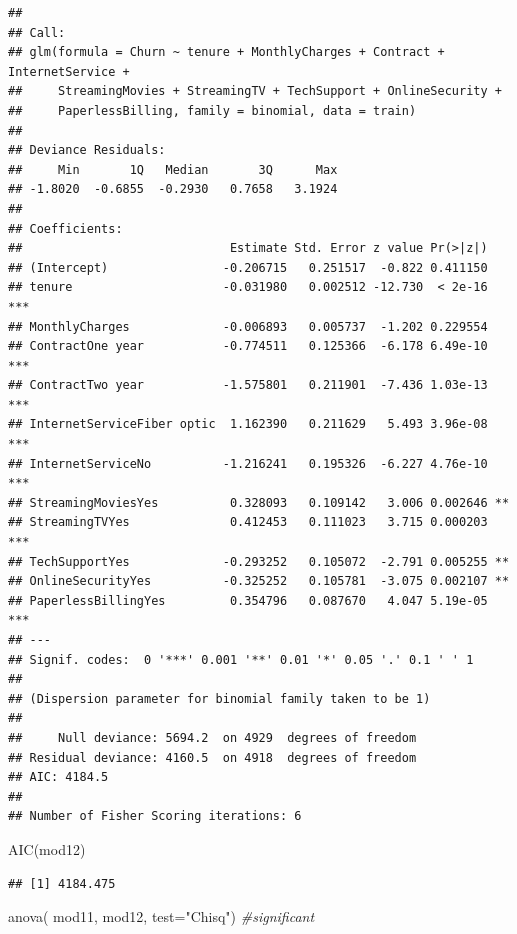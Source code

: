 \documentclass[
  twoside]{article}
\newenvironment{Shaded}{\begin{snugshade}}{\end{snugshade}}
\newcommand{\AttributeTok}[1]{\textcolor[rgb]{0.77,0.63,0.00}{#1}}
\newcommand{\CommentTok}[1]{\textcolor[rgb]{0.56,0.35,0.01}{\textit{#1}}}
\newcommand{\FunctionTok}[1]{\textcolor[rgb]{0.00,0.00,0.00}{#1}}
\newcommand{\NormalTok}[1]{#1}
\newcommand{\StringTok}[1]{\textcolor[rgb]{0.31,0.60,0.02}{#1}}
\begin{document}
\begin{verbatim}
## 
## Call:
## glm(formula = Churn ~ tenure + MonthlyCharges + Contract + InternetService + 
##     StreamingMovies + StreamingTV + TechSupport + OnlineSecurity + 
##     PaperlessBilling, family = binomial, data = train)
## 
## Deviance Residuals: 
##     Min       1Q   Median       3Q      Max  
## -1.8020  -0.6855  -0.2930   0.7658   3.1924  
## 
## Coefficients:
##                             Estimate Std. Error z value Pr(>|z|)    
## (Intercept)                -0.206715   0.251517  -0.822 0.411150    
## tenure                     -0.031980   0.002512 -12.730  < 2e-16 ***
## MonthlyCharges             -0.006893   0.005737  -1.202 0.229554    
## ContractOne year           -0.774511   0.125366  -6.178 6.49e-10 ***
## ContractTwo year           -1.575801   0.211901  -7.436 1.03e-13 ***
## InternetServiceFiber optic  1.162390   0.211629   5.493 3.96e-08 ***
## InternetServiceNo          -1.216241   0.195326  -6.227 4.76e-10 ***
## StreamingMoviesYes          0.328093   0.109142   3.006 0.002646 ** 
## StreamingTVYes              0.412453   0.111023   3.715 0.000203 ***
## TechSupportYes             -0.293252   0.105072  -2.791 0.005255 ** 
## OnlineSecurityYes          -0.325252   0.105781  -3.075 0.002107 ** 
## PaperlessBillingYes         0.354796   0.087670   4.047 5.19e-05 ***
## ---
## Signif. codes:  0 '***' 0.001 '**' 0.01 '*' 0.05 '.' 0.1 ' ' 1
## 
## (Dispersion parameter for binomial family taken to be 1)
## 
##     Null deviance: 5694.2  on 4929  degrees of freedom
## Residual deviance: 4160.5  on 4918  degrees of freedom
## AIC: 4184.5
## 
## Number of Fisher Scoring iterations: 6
\end{verbatim}

\begin{Shaded}
\begin{Highlighting}[]
\FunctionTok{AIC}\NormalTok{(mod12)}
\end{Highlighting}
\end{Shaded}

\begin{verbatim}
## [1] 4184.475
\end{verbatim}

\begin{Shaded}
\begin{Highlighting}[]
\FunctionTok{anova}\NormalTok{( mod11, mod12,  }\AttributeTok{test=}\StringTok{"Chisq"}\NormalTok{) }\CommentTok{\#significant}
\end{Highlighting}
\end{Shaded}
\end{document}
